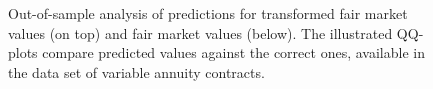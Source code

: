 \begin{figure}[h!]
\caption{Out-of-sample analysis of predictions for transformed fair market values (on top) and fair market values (below). The illustrated QQ-plots compare predicted values against the correct ones, available in the data set of variable annuity contracts.}\label{predictions_out_of_sample}
\end{figure}


